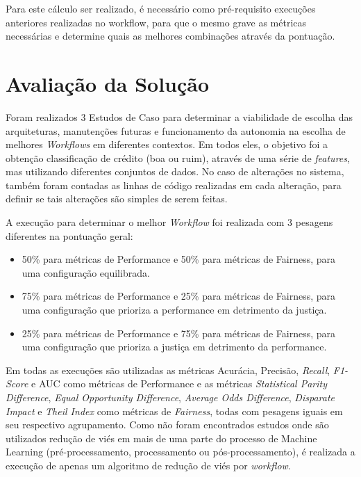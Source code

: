 \documentclass[twocolumn]{article}
\begin{document}
Para este cálculo ser realizado, é necessário como pré-requisito execuções anteriores realizadas no workflow, para que o mesmo grave as métricas necessárias e determine quais as melhores combinações através da pontuação.

\section{Avaliação da Solução}

Foram realizados 3 Estudos de Caso para determinar a viabilidade de escolha das arquiteturas, manutenções futuras e funcionamento da autonomia na escolha de melhores \textit{Workflows} em diferentes contextos. Em todos eles, o objetivo foi a obtenção classificação de crédito (boa ou ruim), através de uma série de \textit{features}, mas utilizando diferentes conjuntos de dados. No caso de alterações no sistema, também foram contadas as linhas de código realizadas em cada alteração, para definir se tais alterações são simples de serem feitas.

A execução para determinar o melhor \textit{Workflow} foi realizada com 3 pesagens diferentes na pontuação geral:

\begin{itemize}
\item 50\% para métricas de Performance e 50\% para métricas de Fairness, para uma configuração equilibrada.
\item 75\% para métricas de Performance e 25\% para métricas de Fairness, para uma configuração que prioriza a performance em detrimento da justiça.
\item 25\% para métricas de Performance e 75\% para métricas de Fairness, para uma configuração que prioriza a justiça em detrimento da performance.
\end{itemize}

Em todas as execuções são utilizadas as métricas Acurácia, Precisão, \textit{Recall}, \textit{F1-Score} e AUC como métricas de Performance e as métricas \textit{Statistical Parity Difference}, \textit{Equal Opportunity Difference}, \textit{Average Odds Difference}, \textit{Disparate Impact} e \textit{Theil Index} como métricas de \textit{Fairness}, todas com pesagens iguais em seu respectivo agrupamento. Como não foram encontrados estudos onde são utilizados redução de viés em mais de uma parte do processo de Machine Learning (pré-processamento, processamento ou pós-processamento), é realizada a execução de apenas um algoritmo de redução de viés por \textit{workflow}.
\end{document}
